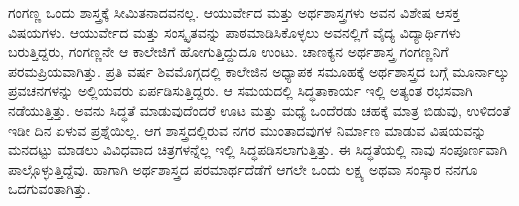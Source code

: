 {ಗಂಗಣ್ಣ ಒಂದು ಶಾಸ್ತ್ರಕ್ಕೆ ಸೀಮಿತನಾದವನಲ್ಲ. ಆಯುರ್ವೇದ ಮತ್ತು ಅರ್ಥ\-ಶಾಸ್ತ್ರಗಳು ಅವನ ವಿಶೇಷ ಆಸಕ್ತ ವಿಷಯಗಳು. ಆಯುರ್ವೇದ ಮತ್ತು ಸಂಸ್ಕೃತವನ್ನು ಪಾಠಮಾಡಿಸಿಕೊಳ್ಳಲು ಅವನಲ್ಲಿಗೆ ವೈದ್ಯ ವಿದ್ಯಾರ್ಥಿಗಳು ಬರುತ್ತಿದ್ದರು, ಗಂಗಣ್ಣನೇ ಆ ಕಾಲೇಜಿಗೆ ಹೋಗುತ್ತಿದ್ದುದೂ ಉಂಟು. ಚಾಣಕ್ಯನ ಅರ್ಥಶಾಸ್ತ್ರ ಗಂಗಣ್ಣನಿಗೆ ಪರಮ\-ಪ್ರಿಯವಾಗಿತ್ತು. ಪ್ರತಿ ವರ್ಷ ಶಿವಮೊಗ್ಗದಲ್ಲಿ ಕಾಲೇಜಿನ ಅಧ್ಯಾಪಕ ಸಮೂಹಕ್ಕೆ ಅರ್ಥಶಾಸ್ತ್ರದ ಬಗ್ಗೆ ಮೂರ್ನಾಲ್ಕು ಪ್ರವಚನಗಳನ್ನು ಅಲ್ಲಿಯವರು ಏರ್ಪಡಿಸುತ್ತಿದ್ದರು. ಆ ಸಮಯದಲ್ಲಿ ಸಿದ್ಧತಾಕಾರ್ಯ ಇಲ್ಲಿ ಅತ್ಯಂತ ರಭಸವಾಗಿ ನಡೆಯುತ್ತಿತ್ತು. ಅವನು ಸಿದ್ಧತೆ ಮಾಡುವುದೆಂದರೆ ಊಟ ಮತ್ತು ಮಧ್ಯೆ ಒಂದೆರಡು ಚಹಕ್ಕೆ  ಮಾತ್ರ ಬಿಡುವು, ಉಳಿದಂತೆ ಇಡೀ ದಿನ ಏಳುವ ಪ್ರಶ್ನೆಯಿಲ್ಲ. ಆಗ ಶಾಸ್ತ್ರದಲ್ಲಿರುವ ನಗರ ಮುಂತಾದವುಗಳ ನಿರ್ಮಾಣ ಮಾಡುವ ವಿಷಯವನ್ನು ಮನದಟ್ಟು ಮಾಡಲು ವಿವಿಧವಾದ ಚಿತ್ರ\-ಗಳನ್ನೆಲ್ಲ ಇಲ್ಲಿ ಸಿದ್ಧಪಡಿಸಲಾಗುತ್ತಿತ್ತು. ಈ ಸಿದ್ಧತೆಯಲ್ಲಿ  ನಾವು ಸಂಪೂರ್ಣವಾಗಿ ಪಾಲ್ಗೊಳ್ಳು\-ತ್ತಿದ್ದೆವು. ಹಾಗಾಗಿ ಅರ್ಥಶಾಸ್ತ್ರದ ಪರಮಾರ್ಥದೆಡೆಗೆ ಆಗಲೇ ಒಂದು ಲಕ್ಷ್ಯ ಅಥವಾ ಸಂಸ್ಕಾರ ನನಗೂ ಒದಗುವಂತಾಗಿತ್ತು.

}
